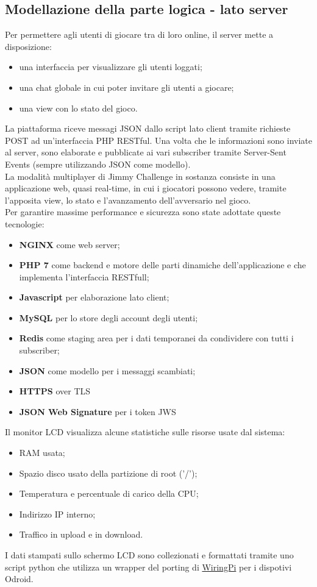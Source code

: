 \subsection{Modellazione della parte logica - lato server}
Per permettere agli utenti di giocare tra di loro online, il server mette a disposizione:
\begin{itemize}
	\item una interfaccia per visualizzare gli utenti loggati;
	\item una chat globale in cui poter invitare gli utenti a giocare;
	\item una view con lo stato del gioco.
\end{itemize}
La piattaforma riceve messagi JSON dallo script lato client tramite richieste POST ad un'interfaccia PHP RESTful. Una volta che le informazioni sono inviate al server, sono elaborate e pubblicate ai vari subscriber tramite Server-Sent Events (sempre utilizzando JSON come modello).\\
La modalità multiplayer di Jimmy Challenge in sostanza consiste in una applicazione web, quasi real-time, in cui i giocatori possono vedere, tramite l'apposita view, lo stato e l'avanzamento dell'avversario nel gioco.\\
Per garantire massime performance e sicurezza sono state adottate queste tecnologie:
\begin{itemize}
	\item \textbf{NGINX} come web server;
	\item \textbf{PHP 7} come backend e motore delle parti dinamiche dell'applicazione e che implementa l'interfaccia RESTfull;
	\item \textbf{Javascript} per elaborazione lato client;
	\item \textbf{MySQL} per lo store degli account degli utenti;
	\item \textbf{Redis} come staging area per i dati temporanei da condividere con tutti i subscriber;
	\item \textbf{JSON} come modello per i messaggi scambiati;
	\item \textbf{HTTPS} over TLS
	\item \textbf{JSON Web Signature} per i token JWS
\end{itemize}
Il monitor LCD visualizza alcune statistiche sulle risorse usate dal sistema:
\begin{itemize}
	\item RAM usata;
	\item Spazio disco usato della partizione di root ('/');
	\item Temperatura e percentuale di carico della CPU;
	\item Indirizzo IP interno;
	\item Traffico in upload e in download.
\end{itemize}
I dati stampati sullo schermo LCD sono collezionati e formattati tramite uno script python che utilizza un wrapper del porting di \href{https://github.com/hardkernel/WiringPi2-Python}{WiringPi} per i dispotivi Odroid.

